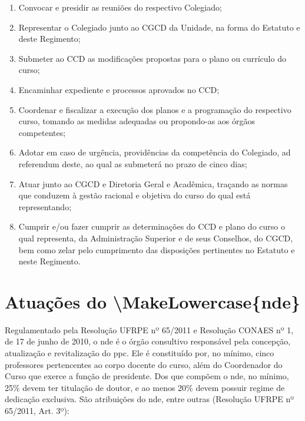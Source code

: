 \documentclass[
	12pt,				%
	openright,			%
  oneside,     %
	a4paper,			%
 hyphens,
	chapter=TITLE,		%
	english,			%
	french,				%
	spanish,			%
	brazil				%
	]{abntex2}
\begin{document}
\begin{enumerate}
    \item Convocar e presidir as reuniões do respectivo Colegiado; 	
    \item Representar o Colegiado junto ao CGCD da Unidade, na forma do Estatuto e deste Regimento;
    \item Submeter ao CCD as modificações propostas para o plano ou currículo do curso;
    \item Encaminhar expediente e processos aprovados no CCD;
    \item Coordenar e fiscalizar a execução dos planos e a programação do respectivo curso, tomando as medidas adequadas ou propondo-as aos órgãos competentes; 
    \item Adotar em caso de urgência, 	providências da competência do Colegiado, ad referendum deste, ao qual as submeterá no prazo de cinco dias;
    \item Atuar junto ao CGCD e Diretoria Geral e Acadêmica, traçando as normas que conduzem à gestão racional e objetiva do curso do qual está representando;
    \item Cumprir e/ou fazer cumprir as determinações do CCD e plano do curso o qual representa, da Administração Superior e de seus Conselhos, do CGCD, bem como zelar pelo cumprimento das disposições pertinentes no Estatuto e neste Regimento.
\end{enumerate}

\section{Atuações do \acrfull{\MakeLowercase{nde}}}

Regulamentado pela Resolução UFRPE nº 65/2011 e Resolução CONAES nº 1, de 17 de junho de 2010, o \acrshort{nde} é o órgão consultivo responsável pela concepção, atualização e revitalização do \acrshort{ppc}. Ele é constituído por, no mínimo, cinco professores pertencentes ao corpo docente do curso, além do Coordenador do Curso que exerce a função de presidente. Dos que compõem o \acrshort{nde}, no mínimo, 25\% devem ter titulação de doutor, e ao menos 20\% devem possuir regime de dedicação exclusiva. São atribuições do \acrshort{nde}, entre outras (Resolução UFRPE nº 65/2011, Art. 3º):
\end{document}
